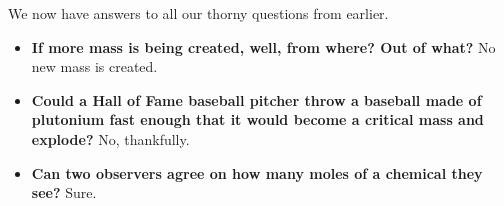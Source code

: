 \documentclass[10pt,letterpaper,oneside,notitlepage]{article}
\begin{document}
We now have answers to all our thorny questions from earlier.

\begin{itemize}
  \item
  \textbf{If more mass is being created, well, from where? Out of what?}
  No new mass is created.

  \item
  \textbf{Could a Hall of Fame baseball pitcher throw a baseball made 
  of plutonium fast enough that it would become a critical mass and explode?}
  No, thankfully.

  \item
  \textbf{Can two observers agree on how many moles of a chemical they see?}
  Sure.
\end{itemize}
\end{document}
